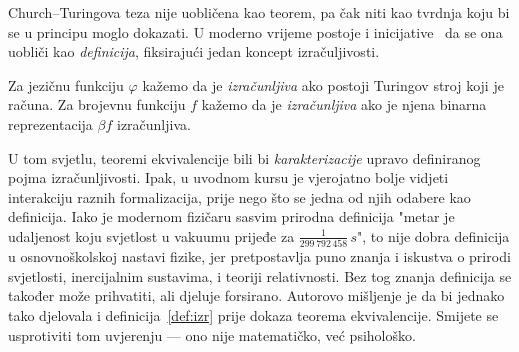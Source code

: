 Church--\!Turingova teza nije uobličena kao teorem, pa čak niti kao tvrdnja koju bi se u principu moglo dokazati. U moderno vrijeme postoje i inicijative~\cite{soare} da se ona uobliči kao \emph{definicija}, fiksirajući jedan koncept izračuljivosti.

\begin{definicija}\label{def:izr}
Za jezičnu funkciju $\varphi$ kažemo da je \emph{izračunljiva} ako postoji Turingov stroj koji je računa.
Za brojevnu funkciju $f$ kažemo da je \emph{izračunljiva} ako je njena binarna reprezentacija $\beta f$ izračunljiva.
\end{definicija}

U tom svjetlu, teoremi ekvivalencije bili bi \emph{karakterizacije} upravo definiranog pojma izračunljivosti. Ipak, u uvodnom kursu je vjerojatno bolje vidjeti interakciju raznih formalizacija, prije nego što se jedna od njih odabere kao definicija. Iako je modernom fizičaru sasvim prirodna definicija "metar je udaljenost koju svjetlost u vakuumu prijeđe za $\frac{1}{299\,792\,458}\,s$", to nije dobra definicija u osnovnoškolskoj nastavi fizike, jer pretpostavlja puno znanja i iskustva o prirodi svjetlosti, inercijalnim sustavima, i teoriji relativnosti. Bez tog znanja definicija se također može prihvatiti, ali djeluje forsirano. Autorovo mišljenje je da bi jednako tako djelovala i definicija~\ref{def:izr} prije dokaza teorema ekvivalencije. Smijete se usprotiviti tom uvjerenju --- ono nije matematičko, već psihološko.

